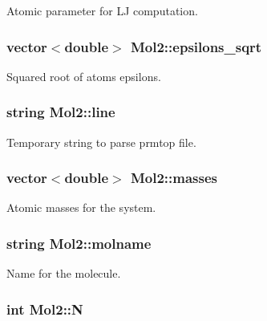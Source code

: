Atomic parameter for LJ computation. 

\hypertarget{classMol2_ae70f58cb375c447b9ec696083ee9eef8}{
\subsubsection[{epsilons\_\-sqrt}]{\setlength{\rightskip}{0pt plus 5cm}vector$<$double$>$ {\bf Mol2::epsilons\_\-sqrt}}}
\label{classMol2_ae70f58cb375c447b9ec696083ee9eef8}


Squared root of atoms epsilons. 

\hypertarget{classMol2_a67ceb39981358eff84552a6eefa21065}{
\subsubsection[{line}]{\setlength{\rightskip}{0pt plus 5cm}string {\bf Mol2::line}}}
\label{classMol2_a67ceb39981358eff84552a6eefa21065}


Temporary string to parse prmtop file. 

\hypertarget{classMol2_a74b5089ad2715395ee10b9fd88bff5cb}{
\subsubsection[{masses}]{\setlength{\rightskip}{0pt plus 5cm}vector$<$double$>$ {\bf Mol2::masses}}}
\label{classMol2_a74b5089ad2715395ee10b9fd88bff5cb}


Atomic masses for the system. 

\hypertarget{classMol2_a55113887837f3028146348ff6a0cc1b4}{
\subsubsection[{molname}]{\setlength{\rightskip}{0pt plus 5cm}string {\bf Mol2::molname}}}
\label{classMol2_a55113887837f3028146348ff6a0cc1b4}


Name for the molecule. 

\hypertarget{classMol2_a7fcd40f8ea09f926d94e8394afb4751b}{
\subsubsection[{N}]{\setlength{\rightskip}{0pt plus 5cm}int {\bf Mol2::N}}}
\label{classMol2_a7fcd40f8ea09f926d94e8394afb4751b}



